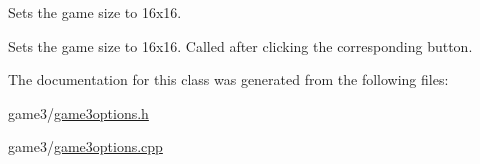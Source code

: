 \-Sets the game size to 16x16. 

\-Sets the game size to 16x16. \-Called after clicking the corresponding button. 

\-The documentation for this class was generated from the following files\-:\begin{DoxyCompactItemize}
\item 
game3/\hyperlink{game3options_8h}{game3options.\-h}\item 
game3/\hyperlink{game3options_8cpp}{game3options.\-cpp}\end{DoxyCompactItemize}
